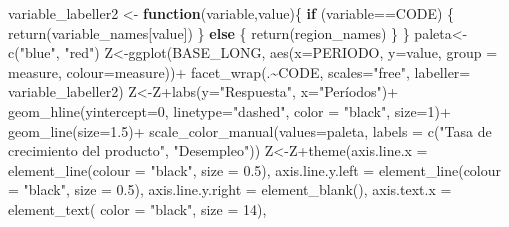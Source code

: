 \documentclass[
]{book}
\newenvironment{Shaded}{\begin{snugshade}}{\end{snugshade}}
\newcommand{\AttributeTok}[1]{\textcolor[rgb]{0.77,0.63,0.00}{#1}}
\newcommand{\ControlFlowTok}[1]{\textcolor[rgb]{0.13,0.29,0.53}{\textbf{#1}}}
\newcommand{\DecValTok}[1]{\textcolor[rgb]{0.00,0.00,0.81}{#1}}
\newcommand{\FloatTok}[1]{\textcolor[rgb]{0.00,0.00,0.81}{#1}}
\newcommand{\FunctionTok}[1]{\textcolor[rgb]{0.00,0.00,0.00}{#1}}
\newcommand{\NormalTok}[1]{#1}
\newcommand{\OtherTok}[1]{\textcolor[rgb]{0.56,0.35,0.01}{#1}}
\newcommand{\SpecialCharTok}[1]{\textcolor[rgb]{0.00,0.00,0.00}{#1}}
\newcommand{\StringTok}[1]{\textcolor[rgb]{0.31,0.60,0.02}{#1}}
\begin{document}
\begin{Shaded}
\begin{Highlighting}[]
\NormalTok{variable\_labeller2 }\OtherTok{\textless{}{-}} \ControlFlowTok{function}\NormalTok{(variable,value)\{}
  \ControlFlowTok{if}\NormalTok{ (variable}\SpecialCharTok{==}\StringTok{\textquotesingle{}CODE\textquotesingle{}}\NormalTok{) \{}
    \FunctionTok{return}\NormalTok{(variable\_names[value])}
\NormalTok{  \} }\ControlFlowTok{else}\NormalTok{ \{}
    \FunctionTok{return}\NormalTok{(region\_names)}
\NormalTok{  \}}
\NormalTok{\}}
\NormalTok{paleta}\OtherTok{\textless{}{-}}\FunctionTok{c}\NormalTok{(}\StringTok{"blue"}\NormalTok{, }\StringTok{"red"}\NormalTok{)}
\NormalTok{Z}\OtherTok{\textless{}{-}}\FunctionTok{ggplot}\NormalTok{(BASE\_LONG, }\FunctionTok{aes}\NormalTok{(}\AttributeTok{x=}\NormalTok{PERIODO, }\AttributeTok{y=}\NormalTok{value, }\AttributeTok{group =}\NormalTok{ measure,}
                         \AttributeTok{colour=}\NormalTok{measure))}\SpecialCharTok{+}
  \FunctionTok{facet\_wrap}\NormalTok{(.}\SpecialCharTok{\textasciitilde{}}\NormalTok{CODE, }\AttributeTok{scales=}\StringTok{"free"}\NormalTok{, }\AttributeTok{labeller=}\NormalTok{ variable\_labeller2)}
\NormalTok{Z}\OtherTok{\textless{}{-}}\NormalTok{Z}\SpecialCharTok{+}\FunctionTok{labs}\NormalTok{(}\AttributeTok{y=}\StringTok{"Respuesta"}\NormalTok{,}
          \AttributeTok{x=}\StringTok{"Períodos"}\NormalTok{)}\SpecialCharTok{+}
  \FunctionTok{geom\_hline}\NormalTok{(}\AttributeTok{yintercept=}\DecValTok{0}\NormalTok{, }\AttributeTok{linetype=}\StringTok{"dashed"}\NormalTok{,}
             \AttributeTok{color =} \StringTok{"black"}\NormalTok{, }\AttributeTok{size=}\DecValTok{1}\NormalTok{)}\SpecialCharTok{+}
  \FunctionTok{geom\_line}\NormalTok{(}\AttributeTok{size=}\FloatTok{1.5}\NormalTok{)}\SpecialCharTok{+}
  \FunctionTok{scale\_color\_manual}\NormalTok{(}\AttributeTok{values=}\NormalTok{paleta,}
                     \AttributeTok{labels =} \FunctionTok{c}\NormalTok{(}\StringTok{"Tasa de crecimiento del producto"}\NormalTok{,}
                                \StringTok{"Desempleo"}\NormalTok{))}
\NormalTok{Z}\OtherTok{\textless{}{-}}\NormalTok{Z}\SpecialCharTok{+}\FunctionTok{theme}\NormalTok{(}\AttributeTok{axis.line.x =} \FunctionTok{element\_line}\NormalTok{(}\AttributeTok{colour =} \StringTok{"black"}\NormalTok{, }\AttributeTok{size =} \FloatTok{0.5}\NormalTok{),}
           \AttributeTok{axis.line.y.left  =} \FunctionTok{element\_line}\NormalTok{(}\AttributeTok{colour =} \StringTok{"black"}\NormalTok{, }\AttributeTok{size =} \FloatTok{0.5}\NormalTok{),}
           \AttributeTok{axis.line.y.right =} \FunctionTok{element\_blank}\NormalTok{(),}
           \AttributeTok{axis.text.x =} \FunctionTok{element\_text}\NormalTok{( }\AttributeTok{color =} \StringTok{"black"}\NormalTok{, }\AttributeTok{size =} \DecValTok{14}\NormalTok{),}

\end{Highlighting}
\end{Shaded}
\end{document}
